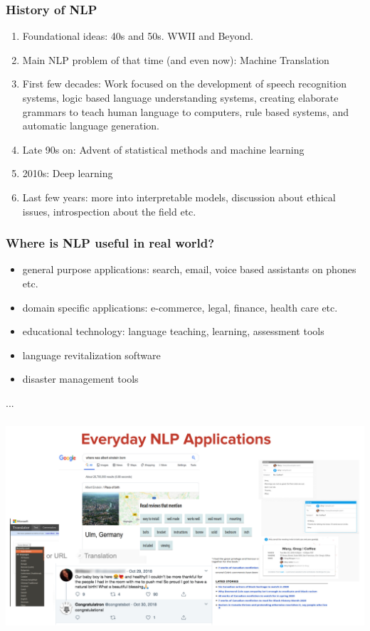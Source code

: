\documentclass{beamer}
\begin{document}
\begin{frame}
\frametitle{History of NLP}
\begin{enumerate}
\item Foundational ideas: 40s and 50s. WWII and Beyond.
\item Main NLP problem of that time (and even now): Machine Translation
\item First few decades: Work focused on the development of speech recognition systems, logic based language understanding systems, creating elaborate grammars to teach human language to computers, rule based systems, and automatic language generation.
\item Late 90s on: Advent of statistical methods and machine learning
\item 2010s: Deep learning
\item Last few years: more into interpretable models, discussion about ethical issues, introspection about the field etc. 
\end{enumerate}
\end{frame}

\begin{frame}
\frametitle{Where is NLP useful in real world?}
\begin{itemize}
    \item general purpose applications: search, email, voice based assistants on phones etc.
    \item domain specific applications: e-commerce, legal, finance, health care etc. 
    \item educational technology: language teaching, learning, assessment tools 
    \item language revitalization software
    \item disaster management tools 
\end{itemize}
... 
\end{frame}

\begin{frame}
\frametitle{}
\includegraphics[width=\textwidth]{figures/everydaynlp.png}
\end{frame}
\end{document}
